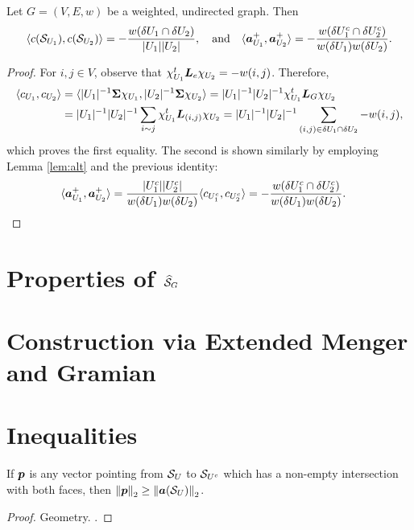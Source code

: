 \begin{lemma}
Let $G=(V,E,w)$ be a weighted, undirected graph. Then 
\begin{equation*}
    \langle c(\mathcal{S}_{U_1}),c(\mathcal{S}_{U_2})\rangle = - \frac{w(\delta U_1\cap \delta U_2)}{|U_1||U_2|},\quad\text{and}\quad \langle \vb*{a}^+_{U_1},\vb*{a}^+_{U_2}\rangle = -\frac{w(\delta U_1^c\cap \delta U_2^c)}{w(\delta U_1)w(\delta U_2)}.
\end{equation*}
\end{lemma}
\begin{proof}
For $i,j\in V$, observe that $\chi_{U_1}^t \vb*{L}_e\chi_{U_2}=-w(i,j)$. Therefore, 
\begin{align*}
    \langle c_{U_1},c_{U_2}\rangle &= \langle |U_1|^{-1}\boldsymbol{\Sigma}\chi_{U_1},|U_2|^{-1}\boldsymbol{\Sigma}\chi_{U_2}\rangle = |U_1|^{-1}|U_2|^{-1} \chi_{U_1}^t \vb*{L}_G\chi_{U_2} \\
    &= |U_1|^{-1}|U_2|^{-1}\sum_{i\sim j} \chi_{U_1}^t \vb*{L}_{(i,j)}\chi_{U_2} = |U_1|^{-1}|U_2|^{-1}\sum_{(i,j)\in \delta U_1\cap \delta U_2} -w(i,j),
\end{align*}
which proves the first equality. The second is shown similarly by employing Lemma \ref{lem:alt} and the previous identity:
\begin{align*}
    \langle \vb*{a}^+_{U_1},\vb*{a}^+_{U_2}\rangle &= \frac{|U_1^c||U_2^c|}{w(\delta U_1) w(\delta U_2)}\langle c_{U_1^c},c_{U_2^c}\rangle
    =-\frac{w(\delta U_1^c\cap \delta U_2^c)}{w(\delta U_1)w(\delta U_2)}.\qedhere
\end{align*}

\end{proof}

\section{Properties of \texorpdfstring{$\widehat{\mathcal{S}}_G$}{the normalized Simplex}}

\section{Construction via Extended Menger and Gramian}





\section{Inequalities}

\begin{lemma}
If $\vb*{p}$ is any vector pointing from $\mathcal{S}_U$ to $\mathcal{S}_{U^c}$ which has a non-empty intersection with both faces, then $\norm{\vb*{p}}_2 \geq \norm{\vb*{a}(\mathcal{S}_U)}_2$. 
\end{lemma}
\begin{proof}
Geometry. . 
\end{proof}

